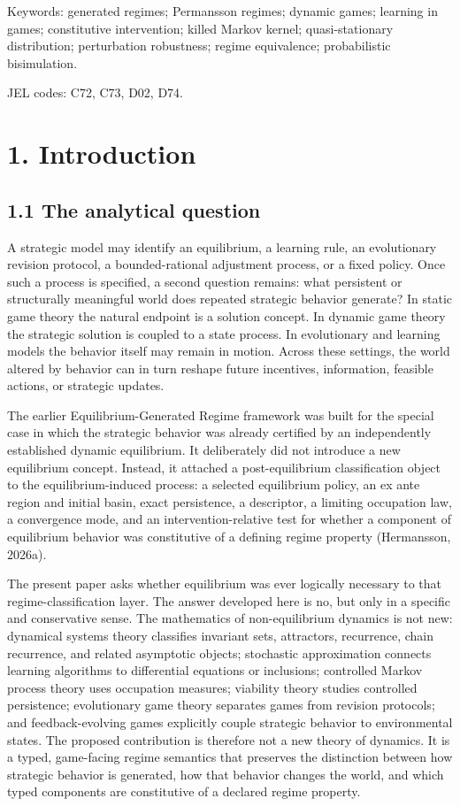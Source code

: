 \documentclass[10pt]{article}
\begin{document}
Keywords: generated regimes; Permansson regimes; dynamic games; learning in games; constitutive intervention; killed Markov kernel; quasi-stationary distribution; perturbation robustness; regime equivalence; probabilistic bisimulation.

JEL codes: C72, C73, D02, D74.

\section{1. Introduction}\label{introduction}

\subsection{1.1 The analytical question}\label{the-analytical-question}

A strategic model may identify an equilibrium, a learning rule, an
evolutionary revision protocol, a bounded-rational adjustment process,
or a fixed policy. Once such a process is specified, a second question
remains: what persistent or structurally meaningful world does repeated
strategic behavior generate? In static game theory the natural endpoint
is a solution concept. In dynamic game theory the strategic solution is
coupled to a state process. In evolutionary and learning models the
behavior itself may remain in motion. Across these settings, the world
altered by behavior can in turn reshape future incentives, information,
feasible actions, or strategic updates.

The earlier Equilibrium-Generated Regime framework was built for the
special case in which the strategic behavior was already certified by an
independently established dynamic equilibrium. It deliberately did not
introduce a new equilibrium concept. Instead, it attached a
post-equilibrium classification object to the equilibrium-induced
process: a selected equilibrium policy, an ex ante region and initial
basin, exact persistence, a descriptor, a limiting occupation law, a
convergence mode, and an intervention-relative test for whether a
component of equilibrium behavior was constitutive of a defining regime
property (Hermansson, 2026a).

The present paper asks whether equilibrium was ever logically necessary
to that regime-classification layer. The answer developed here is no,
but only in a specific and conservative sense. The mathematics of
non-equilibrium dynamics is not new: dynamical systems theory classifies
invariant sets, attractors, recurrence, chain recurrence, and related
asymptotic objects; stochastic approximation connects learning
algorithms to differential equations or inclusions; controlled Markov
process theory uses occupation measures; viability theory studies
controlled persistence; evolutionary game theory separates games from
revision protocols; and feedback-evolving games explicitly couple
strategic behavior to environmental states. The proposed contribution is
therefore not a new theory of dynamics. It is a typed, game-facing
regime semantics that preserves the distinction between how strategic
behavior is generated, how that behavior changes the world, and which
typed components are constitutive of a declared regime property.
\end{document}
